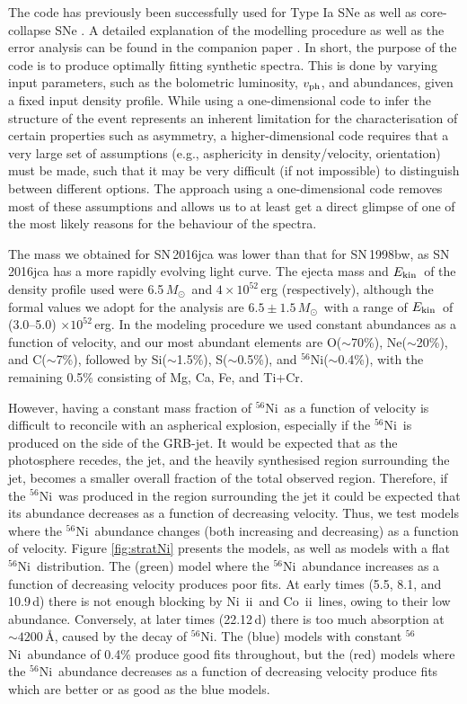 \documentclass[fleqn,usenatbib]{mnras}
\newcommand{\eg}{e.g.,\ }
\newcommand{\Msun}{$M_{\odot}$}
\newcommand{\CoII}{Co~{\sc ii}}
\newcommand{\NiII}{Ni~{\sc ii}}
\newcommand{\Nifs}{$^{56}$Ni}
\newcommand{\KE}{$E_{\rm kin}$}
\newcommand{\ab}{$\sim$}
\begin{document}
The code has previously been successfully used for Type Ia SNe \citep[\eg][]{Ashall14,Ashall16,Ashall18} as well as core-collapse SNe \citep[\eg][]{Mazzali17,Prentice18}. A detailed explanation of the modelling procedure as well as the error analysis can be found in the companion paper \citep{Ashall19}.
In short, the purpose of the code is to produce optimally fitting synthetic spectra. This is done by varying input parameters,
such as the bolometric luminosity, $v_{\rm ph}$, and abundances, given a fixed input density profile. 
While  using a one-dimensional code to infer the structure of the event represents an inherent limitation for the characterisation of certain properties such as asymmetry, a higher-dimensional code requires that a very large set of assumptions (e.g., asphericity in density/velocity, orientation) must be made, such that it may be very difficult (if not impossible) to distinguish between different options. The approach using a one-dimensional code removes most of these assumptions and allows us to at least get a direct glimpse of one of the most likely reasons for the behaviour of the spectra.


The  mass we obtained for SN\,2016jca was lower than that for SN\,1998bw, as SN\,2016jca has a more rapidly evolving light curve. The ejecta mass and \KE\ of the 
density profile used were 6.5\,\Msun\ and $4 \times 10^{52}$\,erg (respectively), although the formal values we adopt for the analysis are  $6.5 \pm 1.5$\,\Msun\ with a range of \KE\ of  (3.0--5.0) $\times 10^{52}$\,erg. In the modeling procedure we used  
constant abundances as a function of velocity,  
and our most abundant elements 
are O(\ab70\%), Ne(\ab20\%), and C(\ab7\%), followed by Si(\ab1.5\%), S(\ab0.5\%), and \Nifs(\ab0.4\%), with the remaining 0.5\% consisting of Mg, Ca, Fe, and Ti+Cr.  

However, having a constant mass fraction of \Nifs\ as a function of velocity is difficult to reconcile with an 
aspherical explosion, especially if the \Nifs\ is produced on the side of the GRB-jet. It would be expected that 
as the photosphere recedes, the jet, and the heavily synthesised region surrounding the jet, becomes a smaller overall fraction 
of the total observed region. Therefore, if the \Nifs\ was produced in the region surrounding the jet it could be 
expected that its abundance decreases as a function of decreasing velocity. 
Thus, we test models where the \Nifs\ abundance changes (both increasing and decreasing) as a function  of velocity.
Figure \ref{fig:stratNi} presents the models, as well as models with a flat \Nifs\ distribution. 
The (green) model where the \Nifs\ abundance increases as a function of decreasing velocity produces poor fits. 
At early times (5.5, 8.1, and 10.9\,d) there is not enough blocking by \NiII\ and \CoII\ lines, owing to their low abundance.
Conversely,  at later times (22.12\,d) there is too much absorption at $\sim4200$\,\AA, caused by the decay of \Nifs. 
The (blue) models with constant \Nifs\ abundance of 0.4\% produce good fits throughout, but 
the (red) models where the \Nifs\ abundance decreases as a function of decreasing velocity produce fits which are better or as good as the blue models.
\end{document}
